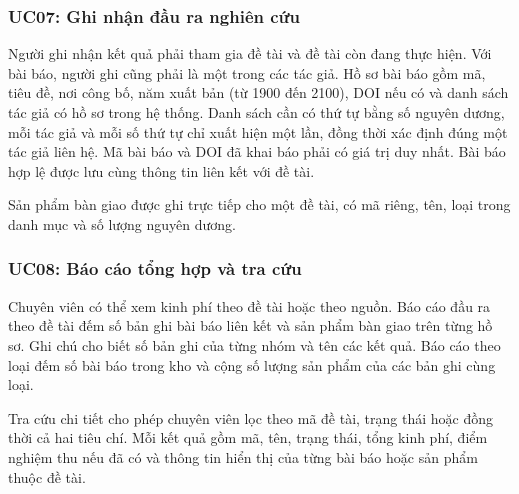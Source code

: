 \subsubsection{UC07: Ghi nhận đầu ra nghiên cứu}
Người ghi nhận kết quả phải tham gia đề tài và đề tài còn đang thực hiện. Với bài báo, người ghi cũng phải là một trong các tác giả. Hồ sơ bài báo gồm mã, tiêu đề, nơi công bố, năm xuất bản (từ 1900 đến 2100), DOI nếu có và danh sách tác giả có hồ sơ trong hệ thống. Danh sách cần có thứ tự bằng số nguyên dương, mỗi tác giả và mỗi số thứ tự chỉ xuất hiện một lần, đồng thời xác định đúng một tác giả liên hệ. Mã bài báo và DOI đã khai báo phải có giá trị duy nhất. Bài báo hợp lệ được lưu cùng thông tin liên kết với đề tài.

Sản phẩm bàn giao được ghi trực tiếp cho một đề tài, có mã riêng, tên, loại trong danh mục và số lượng nguyên dương.

\subsubsection{UC08: Báo cáo tổng hợp và tra cứu}
Chuyên viên có thể xem kinh phí theo đề tài hoặc theo nguồn. Báo cáo đầu ra theo đề tài đếm số bản ghi bài báo liên kết và sản phẩm bàn giao trên từng hồ sơ. Ghi chú cho biết số bản ghi của từng nhóm và tên các kết quả. Báo cáo theo loại đếm số bài báo trong kho và cộng số lượng sản phẩm của các bản ghi cùng loại.

Tra cứu chi tiết cho phép chuyên viên lọc theo mã đề tài, trạng thái hoặc đồng thời cả hai tiêu chí. Mỗi kết quả gồm mã, tên, trạng thái, tổng kinh phí, điểm nghiệm thu nếu đã có và thông tin hiển thị của từng bài báo hoặc sản phẩm thuộc đề tài.

